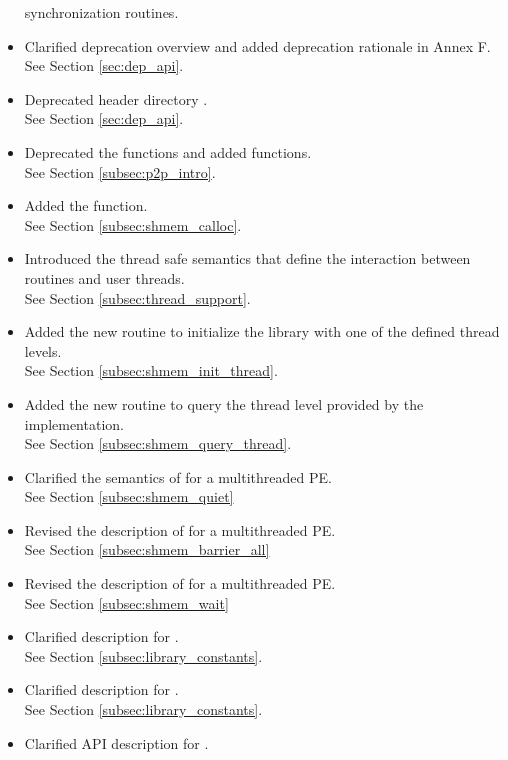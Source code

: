 \begin{itemize}
synchronization routines.
%
\item Clarified deprecation overview and added deprecation rationale in Annex F.
\\See Section \ref{sec:dep_api}.
%
\item Deprecated header directory .
\\See Section \ref{sec:dep_api}.
%
\item Deprecated the  functions and added 
      functions.
\\ See Section \ref{subsec:p2p_intro}.
%
\item Added the  function.
\\ See Section \ref{subsec:shmem_calloc}.
%
\item Introduced the thread safe semantics that define the interaction between
    \openshmem routines and user threads.
\\See Section \ref{subsec:thread_support}.
%
\item Added the new routine  to initialize the
    \openshmem library with one of the defined thread levels.
\\See Section \ref{subsec:shmem_init_thread}.
%
\item Added the new routine  to query the thread
    level provided by the \openshmem implementation.
\\See Section \ref{subsec:shmem_query_thread}.
%
\item Clarified the semantics of  for a multithreaded
    \openshmem \ac{PE}.
\\See Section \ref{subsec:shmem_quiet}
%
\item Revised the description of  for a multithreaded
    \openshmem \ac{PE}.
\\See Section \ref{subsec:shmem_barrier_all}
%
\item Revised the description of  for a multithreaded
    \openshmem \ac{PE}.
\\See Section \ref{subsec:shmem_wait}
%
\item Clarified description for .
\\See Section \ref{subsec:library_constants}.
%
\item Clarified description for .
\\See Section \ref{subsec:library_constants}.
%
\item Clarified API description for .

\end{itemize}

